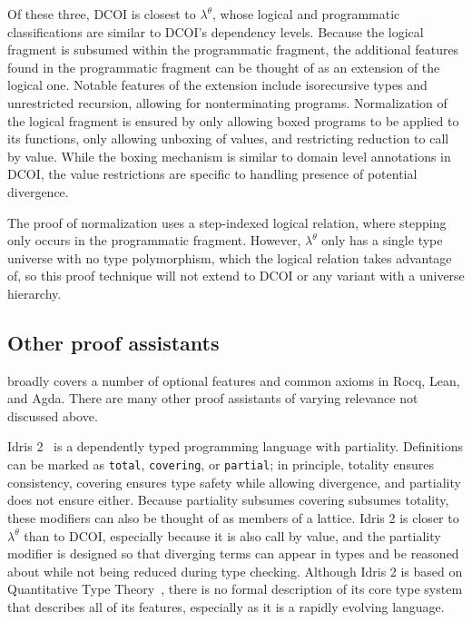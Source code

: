 \documentclass{article}
\newcommand{\code}[1]{\texttt{#1}}
\begin{document}
Of these three, DCOI is closest to $\lambda^\theta$,
whose logical and programmatic classifications are similar to DCOI's dependency levels.
Because the logical fragment is subsumed within the programmatic fragment,
the additional features found in the programmatic fragment can be thought of
as an extension of the logical one.
Notable features of the extension include isorecursive types and unrestricted recursion,
allowing for nonterminating programs.
Normalization of the logical fragment is ensured by
only allowing boxed programs to be applied to its functions,
only allowing unboxing of values,
and restricting reduction to call by value.
While the boxing mechanism is similar to domain level annotations in DCOI,
the value restrictions are specific to handling presence of potential divergence.

The proof of normalization uses a step-indexed logical relation,
where stepping only occurs in the programmatic fragment.
However, $\lambda^\theta$ only has a single type universe with no type polymorphism,
which the logical relation takes advantage of,
so this proof technique will not extend to DCOI or any variant with a universe hierarchy.

\subsection{Other proof assistants}

 broadly covers a number of optional features
and common axioms in Rocq, Lean, and Agda.
There are many other proof assistants of varying relevance not discussed above.

Idris 2~\citep{idris2} is a dependently typed programming language with partiality.
Definitions can be marked as \code{total}, \code{covering}, or \code{partial};
in principle, totality ensures consistency,
covering ensures type safety while allowing divergence,
and partiality does not ensure either.
Because partiality subsumes covering subsumes totality,
these modifiers can also be thought of as members of a lattice.
Idris 2 is closer to $\lambda^\theta$ than to DCOI,
especially because it is also call by value,
and the partiality modifier is designed so that
diverging terms can appear in types and be reasoned about
while not being reduced during type checking.
Although Idris 2 is based on Quantitative Type Theory~\citep{qtt},
there is no formal description of its core type system that describes all of its features,
especially as it is a rapidly evolving language.
\end{document}
